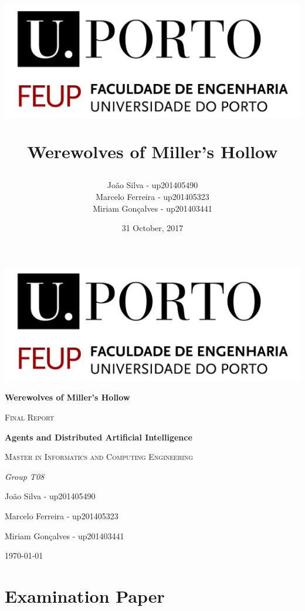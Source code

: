 \documentclass{article}
\title{ \begin{center}
					\includegraphics[scale=0.6]{./images/FEUPlogo}
				\end{center}
				\textbf{Werewolves of Miller's Hollow}}
\author{João Silva - up201405490\\
		Marcelo Ferreira - up201405323\\
		Miriam Gonçalves - up201403441}
\date{31 October, 2017}
\begin{document}
\begin{titlepage}
	\centering
	\includegraphics[width=1\textwidth]{./images/FEUPlogo}\par\vspace{1cm}
	{\huge\bfseries Werewolves of Miller's Hollow \par}
	\vspace{2cm}
	{\scshape\Large Final Report\par}
	\vspace{1.5cm}
	{\large\bfseries Agents and Distributed Artificial Intelligence\par}
	\vspace{0.7cm}
	{\scshape\normalsize  Master in Informatics and Computing Engineering \par}
	\vspace{1.5cm}
	{\Large\itshape Group T08 \par João Silva - up201405490 \par
	Marcelo Ferreira - up201405323 \par
	Miriam Gonçalves - up201403441\par}

	\vfill
	{\large \today\par}
\end{titlepage}
\thispagestyle{empty}

\newpage

\tableofcontents

\newpage

\section{Examination Paper}
\end{document}
